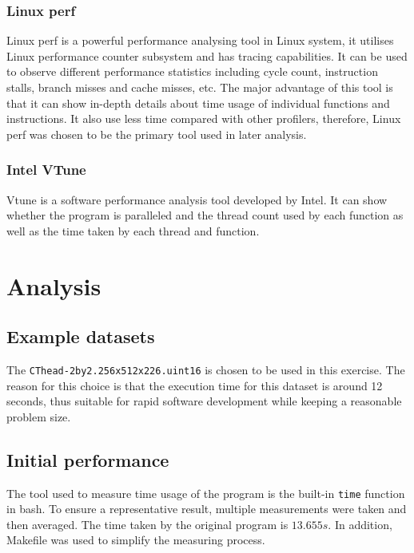 \documentclass[conference]{IEEEtran}
\begin{document}
\subsubsection{Linux perf}

Linux perf \cite{de2010new} is a powerful performance analysing tool in Linux system, it utilises Linux performance counter subsystem and has tracing capabilities. It can be used to observe different performance statistics including cycle count, instruction stalls, branch misses and cache misses, etc. The major advantage of this tool is that it can show in-depth details about time usage of individual functions and instructions. It also use less time compared with other profilers, therefore, Linux perf was chosen to be the primary tool used in later analysis.

\subsubsection{Intel VTune}

Vtune \cite{malladi2009using} is a software performance analysis tool developed by Intel. It can show whether the program is paralleled and the thread count used by each function as well as the time taken by each thread and function.  

\section{Analysis}

\subsection{Example datasets}

The \texttt{CThead-2by2.256x512x226.uint16} is chosen to be used in this exercise. The reason for this choice is that the execution time for this dataset is around 12 seconds, thus suitable for rapid software development while keeping a reasonable problem size.

\subsection{Initial performance}

The tool used to measure time usage of the program is the built-in \texttt{time} function in bash. To ensure a representative result, multiple measurements were taken and then averaged. The time taken by the original program is $13.655 s$. In addition, Makefile was used to simplify the measuring process.
\end{document}
